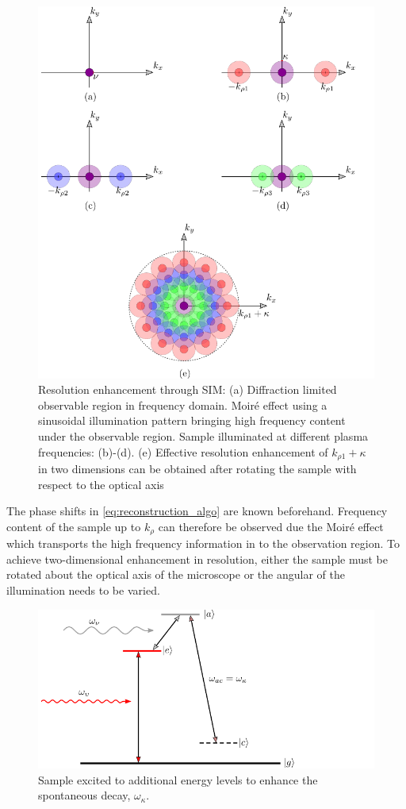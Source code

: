 \documentclass[10pt]{article}
\renewcommand{\^}{\hat}  %
\renewcommand{\O}{\omega}  %
\newcommand{\p}{\rho}  %
\renewcommand{\^}{\hat}  %
\begin{document}
\begin{figure}[t!]
  \centering
  \includegraphics[width=.75\linewidth]{figures/psim}
  \caption{Resolution enhancement through SIM: (a) Diffraction limited observable region in frequency domain. Moiré effect using a sinusoidal illumination pattern bringing high frequency content under the observable region. Sample illuminated at different plasma frequencies: (b)-(d). (e) Effective resolution enhancement of $k_{\p 1} + \kappa$ in two dimensions can be obtained after rotating the sample with respect to the optical axis}
  \label{fig:sim}
\end{figure}
%
The phase shifts in \eqref{eq:reconstruction_algo} are known beforehand. Frequency content of the sample up to $k_{\p}$ can therefore be observed due the Moiré effect which transports the high frequency information in to the observation region. To achieve two-dimensional enhancement in resolution, either the sample must be rotated about the optical axis of the microscope or the angular  of the illumination needs to be varied.
%
\begin{figure}[b!]
  \centering
  \includegraphics[width=.75\linewidth]{figures/e_diag}
  \caption{Sample excited to additional energy levels to enhance the spontaneous decay, $\O_{\kappa}$.}
  \label{fig:e_diag}
\end{figure}
\end{document}
